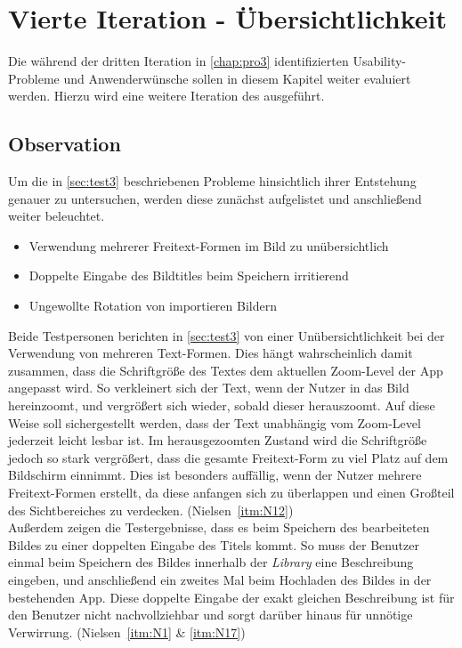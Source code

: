 \chapter{Vierte Iteration - Übersichtlichkeit}
Die während der dritten Iteration in \autoref{chap:pro3} identifizierten Usability-Probleme und Anwenderwünsche sollen in diesem Kapitel weiter evaluiert werden.
Hierzu wird eine weitere Iteration des \hcdp{} ausgeführt.

\section{Observation}
Um die in \autoref{sec:test3} beschriebenen Probleme hinsichtlich ihrer Entstehung genauer zu untersuchen, werden diese zunächst aufgelistet und anschließend weiter beleuchtet.

\begin{itemize}
  \item Verwendung mehrerer Freitext-Formen im Bild zu unübersichtlich
  \item Doppelte Eingabe des Bildtitles beim Speichern irritierend
  \item Ungewollte Rotation von importieren Bildern
\end{itemize}

\noindent
Beide Testpersonen berichten in \autoref{sec:test3} von einer Unübersichtlichkeit bei der Verwendung von mehreren Text-Formen.
Dies hängt wahrscheinlich damit zusammen, dass die Schriftgröße des Textes dem aktuellen Zoom-Level der App angepasst wird.
So verkleinert sich der Text, wenn der Nutzer in das Bild hereinzoomt, und vergrößert sich wieder, sobald dieser herauszoomt.
Auf diese Weise soll sichergestellt werden, dass der Text unabhängig vom Zoom-Level jederzeit leicht lesbar ist.
Im herausgezoomten Zustand wird die Schriftgröße jedoch so stark vergrößert, dass die gesamte Freitext-Form zu viel Platz auf dem Bildschirm einnimmt.
Dies ist besonders auffällig, wenn der Nutzer mehrere Freitext-Formen erstellt, da diese anfangen sich zu überlappen und einen Großteil des Sichtbereiches zu verdecken.
(Nielsen~\autoref{itm:N12}) \\ 

Außerdem zeigen die Testergebnisse, dass es beim Speichern des bearbeiteten Bildes zu einer doppelten Eingabe des Titels kommt.
So muss der Benutzer einmal beim Speichern des Bildes innerhalb der \emph{Library} eine Beschreibung eingeben, und anschließend ein zweites Mal beim Hochladen des Bildes in der bestehenden App.
Diese doppelte Eingabe der exakt gleichen Beschreibung ist für den Benutzer nicht nachvollziehbar und sorgt darüber hinaus für unnötige Verwirrung.
(Nielsen~\autoref{itm:N1} \& \autoref{itm:N17}) 

